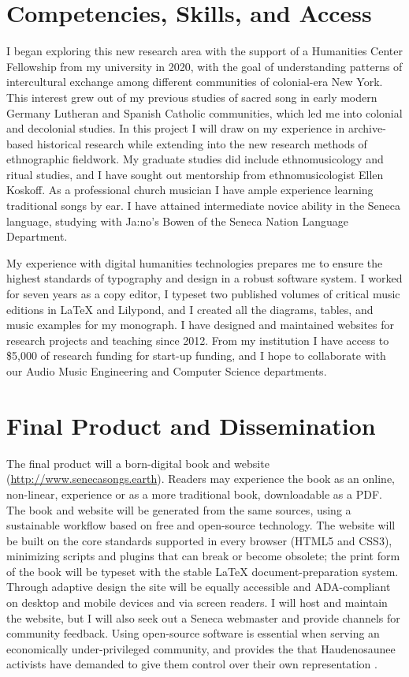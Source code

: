 \documentclass{neh}
\begin{document}
\section{Competencies, Skills, and Access}

I began exploring this new research area with the support of a Humanities
Center Fellowship from my university in 2020, with the goal of understanding
patterns of intercultural exchange among different communities of colonial-era
New York.
This interest grew out of my previous studies of sacred song in early modern
Germany Lutheran and Spanish Catholic communities, which led me into colonial
and decolonial studies.
In this project I will draw on my experience in archive-based historical
research while extending into the new research methods of ethnographic
fieldwork.
My graduate studies did include ethnomusicology and ritual studies, and I have
sought out mentorship from ethnomusicologist Ellen Koskoff.
As a professional church musician I have ample experience learning traditional
songs by ear.
I have attained intermediate novice ability in the Seneca language, studying
with Ja:no’s Bowen of the Seneca Nation Language Department.

My experience with digital humanities technologies prepares me to ensure the
highest standards of typography and design in a robust software system.
I worked for seven years as a copy editor, I typeset two published volumes
of critical music editions in \LaTeX{} and Lilypond, and I created all the
diagrams, tables, and music examples for my monograph.
I have designed and maintained websites for research projects and teaching
since 2012.
From my institution I have access to \$5,000 of research funding for start-up
funding, and I hope to collaborate with our Audio Music Engineering and
Computer Science departments.
\section{Final Product and Dissemination}

The final product will a born-digital book and website
(\url{http://www.senecasongs.earth}).
Readers may experience the book as an online, non-linear, experience or as a
more traditional book, downloadable as a PDF.
The book and website will be generated from the same sources, using a
sustainable workflow based on free and open-source technology.
The website will be built on the core standards supported in every browser
(HTML5 and CSS3), minimizing scripts and plugins that can break or become
obsolete; the print form of the book will be typeset with the stable 
\LaTeX{} document-preparation system.
Through adaptive design the site will be equally accessible and ADA-compliant
on desktop and mobile devices and via screen readers.
I will host and maintain the website, but I will also seek out a Seneca
webmaster and provide channels for community feedback.
Using open-source software is essential when serving an economically
under-privileged community, and provides the 
that Haudenosaunee activists have demanded to give them control
over their own representation
\autocite[123]{BasicCall}.
\end{document}
